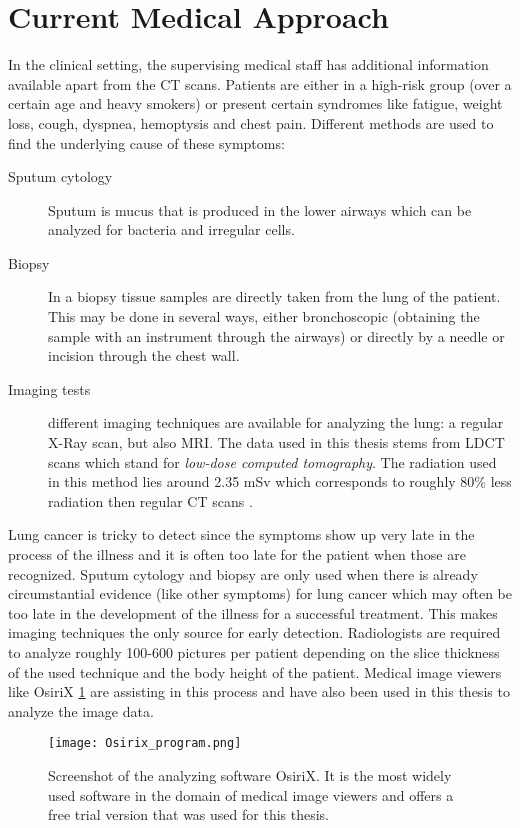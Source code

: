 \documentclass[main.tex]{subfiles}
\begin{document}
\section{Current Medical Approach}
In the clinical setting, the supervising medical staff has additional information available apart from the CT scans. Patients are either in a high-risk group (over a certain age and heavy smokers) or present certain syndromes like fatigue, weight loss, cough, dyspnea, hemoptysis and chest pain. Different methods are used to find the underlying cause of these symptoms:

\begin{description}
\item[Sputum cytology] Sputum is mucus that is produced in the lower airways which can be analyzed for bacteria and irregular cells.
\item[Biopsy] In a biopsy tissue samples are directly taken from the lung of the patient. This may be done in several ways, either bronchoscopic (obtaining the sample with an instrument through the airways) or directly by a needle or incision through the chest wall.
\item[Imaging tests] different imaging techniques are available for analyzing the lung: a regular X-Ray scan, but also MRI. The data used in this thesis stems from LDCT scans which stand for \emph{low-dose computed tomography}. The radiation used in this method lies around 2.35 mSv which corresponds to roughly 80$\%$ less radiation then regular CT scans \cite{ono2013low}.
\end{description}

Lung cancer is tricky to detect since the symptoms show up very late in the process of the illness and it is often too late for the patient when those are recognized. Sputum cytology and biopsy are only used when there is already circumstantial evidence (like other symptoms) for lung cancer which may often be too late in the development of the illness for a successful treatment. This makes imaging techniques the only source for early detection. Radiologists are required to analyze roughly 100-600 pictures per patient depending on the slice thickness of the used technique and the body height of the patient. Medical image viewers like OsiriX \ref{fig:osirix} are assisting in this process and have also been used in this thesis to analyze the image data.

\begin{figure}[ht]
\texttt{[image: Osirix\_program.png]}
\caption{Screenshot of the analyzing software OsiriX. It is the most widely used software in the domain of medical image viewers and offers a free trial version that was used for this thesis.}
\label{fig:osirix}
\end{figure}
\end{document}
